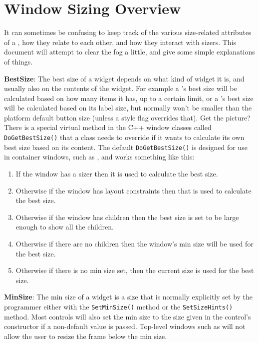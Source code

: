 \section{Window Sizing Overview}\label{windowsizingoverview}




It can sometimes be confusing to keep track of the various
size-related attributes of a , how they
relate to each other, and how they interact with sizers. This document
will attempt to clear the fog a little, and give some simple
explanations of things.

{\bf BestSize}: The best size of a widget depends on what kind of widget it
is, and usually also on the contents of the widget. For example a
's best size will be calculated based on
how many items it has, up to a certain limit, or a
's best size will be calculated based on
its label size, but normally won't be smaller than the platform
default button size (unless a style flag overrides that). Get the
picture? There is a special virtual method in the C++ window classes
called \texttt{DoGetBestSize()} that a class needs to override if it
wants to calculate its own best size based on its content. The default
\texttt{DoGetBestSize()} is designed for use in container windows,
such as , and works something like this:

\begin{enumerate}
  \item{If the window has a sizer then it is used to calculate the best size.}
  \item{Otherwise if the window has layout constraints then that is used to calculate the best size.}
  \item{Otherwise if the window has children then the best size is set to be large enough to show all the children.}
  \item{Otherwise if there are no children then the window's min size will be used for the best size.}
  \item{Otherwise if there is no min size set, then the current size is used for the best size.}
\end{enumerate}

{\bf MinSize}: The min size of a widget is a size that is normally
explicitly set by the programmer either with the \texttt{SetMinSize()}
method or the \texttt{SetSizeHints()} method. Most controls will also
set the min size to the size given in the control's constructor if a
non-default value is passed. Top-level windows such as
 will not allow the user to resize the frame
below the min size.

